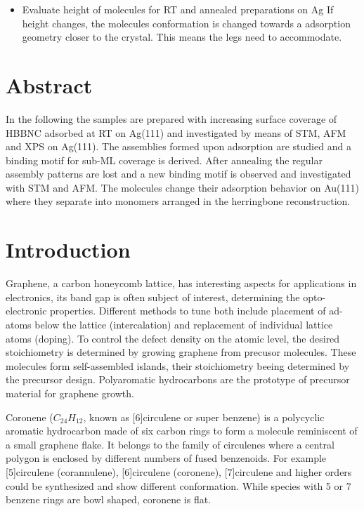 \color{red}
\begin{itemize}
	\item Evaluate height of molecules for RT and annealed preparations on Ag
	\subitem If height changes, the molecules conformation is changed towards a adsorption geometry closer to the crystal. This means the legs need to accommodate.
\end{itemize}
\color{black}

\label{section:HBBNC}
\label{section:HBC}
\section{Abstract}
In the following the samples are prepared with increasing surface coverage of HBBNC adsorbed at RT on Ag(111) and investigated by means of STM, AFM and XPS on Ag(111). The assemblies formed upon adsorption are studied and a binding motif for sub-ML coverage is derived. After annealing the regular assembly patterns are lost and a new binding motif is observed and investigated with STM and AFM. The molecules change their adsorption behavior on Au(111) where they separate into monomers arranged in the herringbone reconstruction.

\section{Introduction}
Graphene, a carbon honeycomb lattice, has interesting aspects for applications in electronics, its band gap is often subject of interest, determining the opto-electronic properties. Different methods to tune both include placement of ad-atoms below the lattice (intercalation) and replacement of individual lattice atoms (doping). To control the defect density on the atomic level, the desired stoichiometry is determined by growing graphene from precusor molecules. These molecules form self-assembled islands, their stoichiometry beeing determined by the precursor design. Polyaromatic hydrocarbons are the prototype of precursor material for graphene growth. 

Coronene ($C_{24}H_{12}$, known as [6]circulene or super benzene) is a polycyclic aromatic hydrocarbon made of six carbon rings to form a molecule reminiscent of a small graphene flake. It belongs to the family of circulenes where a central polygon is enclosed by different numbers of fused benzenoids. For example [5]circulene (corannulene), [6]circulene (coronene), [7]circulene and higher orders could be synthesized and show different conformation. While species with 5 or 7 benzene rings are bowl shaped, coronene is flat.

